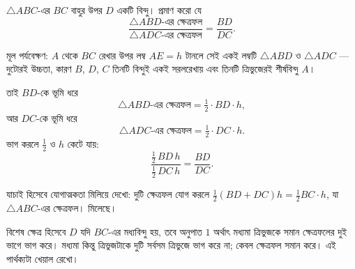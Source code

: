 \documentclass[11pt]{article}
\begin{document}
 $\triangle ABC$-এর $BC$ বাহুর উপর $D$ একটি বিন্দু। প্রমাণ করো যে
\[
  \frac{\triangle ABD\text{-এর ক্ষেত্রফল}}{\triangle ADC\text{-এর ক্ষেত্রফল}}
  = \frac{BD}{DC} .
\]

\begin{center}
\end{center}

\begin{sol}
মূল পর্যবেক্ষণ: $A$ থেকে $BC$ রেখার উপর লম্ব $AE = h$ টানলে সেই একই লম্বটি
$\triangle ABD$ ও $\triangle ADC$ --- দুটোরই উচ্চতা, কারণ $B$, $D$, $C$ তিনটি
বিন্দুই একই সরলরেখায় এবং তিনটি ত্রিভুজেরই শীর্ষবিন্দু $A$।

তাই $BD$-কে ভূমি ধরে
\[
  \triangle ABD\text{-এর ক্ষেত্রফল} = \tfrac{1}{2} \cdot BD \cdot h,
\]
আর $DC$-কে ভূমি ধরে
\[
  \triangle ADC\text{-এর ক্ষেত্রফল} = \tfrac{1}{2} \cdot DC \cdot h .
\]
ভাগ করলে $\tfrac{1}{2}$ ও $h$ কেটে যায়:
\[
  \frac{\tfrac{1}{2}\, BD\, h}{\tfrac{1}{2}\, DC\, h} = \frac{BD}{DC} .
\]

যাচাই হিসেবে যোগাত্মকতা মিলিয়ে দেখো: দুটি ক্ষেত্রফল যোগ করলে
$\tfrac{1}{2}(BD + DC)h = \tfrac{1}{2} BC \cdot h$, যা $\triangle ABC$-এর
ক্ষেত্রফল। মিলেছে।

বিশেষ ক্ষেত্র হিসেবে $D$ যদি $BC$-এর মধ্যবিন্দু হয়, তবে অনুপাত $1$  অর্থাৎ
মধ্যমা ত্রিভুজকে সমান ক্ষেত্রফলের দুই ভাগে ভাগ করে। মধ্যমা কিন্তু ত্রিভুজটাকে
দুটি সর্বসম ত্রিভুজে ভাগ করে না; কেবল ক্ষেত্রফল সমান করে। এই পার্থক্যটা খেয়াল
রেখো।
\end{sol}
\end{document}
